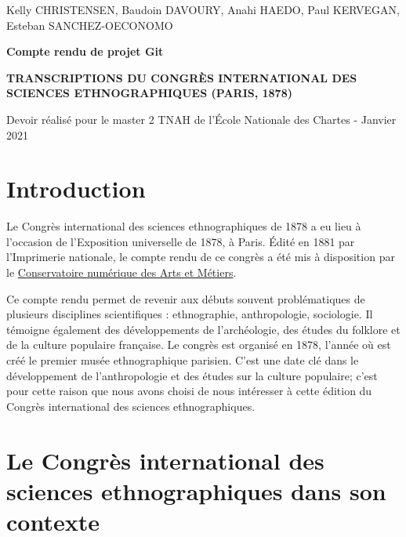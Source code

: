 \documentclass{article}
\begin{document}

	\begin{titlepage}
		\begin{center}
			\large
			Kelly CHRISTENSEN, Baudoin DAVOURY, Anahi HAEDO, Paul KERVEGAN, Esteban SANCHEZ-OECONOMO
			
			\huge
			\vfill
				\textbf{Compte rendu de projet Git}
			
				\textbf{TRANSCRIPTIONS DU CONGRÈS INTERNATIONAL DES SCIENCES ETHNOGRAPHIQUES (PARIS, 1878)}
			\vfill
				
			\large	
			\vfill Devoir réalisé pour le master 2 TNAH de l'École Nationale des Chartes - Janvier 2021
		\end{center}
	\end{titlepage}

	\section{Introduction}
	
	Le Congrès international des sciences ethnographiques de 1878 a eu lieu à l'occasion de l'Exposition universelle de 1878, à Paris. Édité en 1881 par l'Imprimerie nationale, le compte rendu de ce congrès a été mis à disposition par le \href{http://cnum.cnam.fr/CGI/redir.cgi?8XAE243}{Conservatoire numérique des Arts et Métiers}.
	
	Ce compte rendu permet de revenir aux débuts souvent problématiques de plusieurs disciplines scientifiques : ethnographie, anthropologie, sociologie. Il témoigne également des développements de l'archéologie, des études du folklore et de la culture populaire française. Le congrès est organisé en 1878, l'année où est créé le premier musée ethnographique parisien. C'est une date clé dans le développement de l'anthropologie et des études sur la culture populaire; c'est pour cette raison que nous avons choisi de nous intéresser à cette édition du Congrès international des sciences ethnographiques.
	
	
	
	\section{Le Congrès international des sciences ethnographiques dans son contexte}
	
\end{document}
